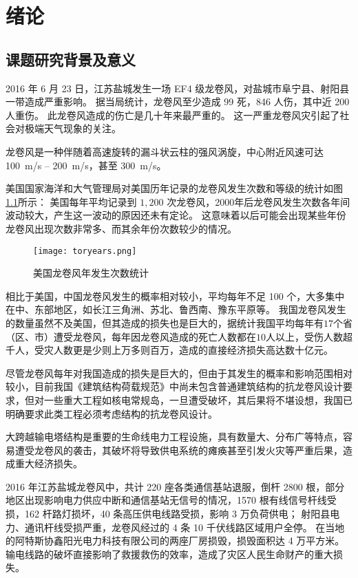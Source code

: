 \graphicspath{{figures/intro/}}

\chapter{绪论}

\section{课题研究背景及意义}
2016 年 6 月 23 日，江苏盐城发生一场 EF4 级龙卷风，对盐城市阜宁县、射阳县一带造成严重影响。
据当局统计，龙卷风至少造成 99 死，846 人伤，其中近 200 人重伤。
此龙卷风造成的伤亡是几十年来最严重的\cite{wiki2016yancheng}。
这一严重龙卷风灾引起了社会对极端天气现象的关注。

龙卷风是一种伴随着高速旋转的漏斗状云柱的强风涡旋，中心附近风速可达 \SI{100}{m/s} -- \SI{200}{m/s}，甚至 \SI{300}{m/s}。

美国国家海洋和大气管理局对美国历年记录的龙卷风发生次数和等级的统计如图\ref{fig:tornado-years}所示\cite{noaa2017tornado}：
美国每年平均记录到 $1,200$ 次龙卷风，2000年后龙卷风发生次数各年间波动较大，产生这一波动的原因还未有定论。
这意味着以后可能会出现某些年份龙卷风出现次数非常多、而其余年份次数较少的情况。

\begin{figure}[!htbp]
    \centering
    \texttt{[image: toryears.png]}
    \caption{美国龙卷风年发生次数统计}
    \label{fig:tornado-years}
\end{figure}

相比于美国，中国龙卷风发生的概率相对较小，平均每年不足 100 个，大多集中在中、东部地区，如长江三角洲、苏北、鲁西南、豫东平原等。
我国龙卷风发生的数量虽然不及美国，但其造成的损失也是巨大的，据统计我国平均每年有$17$个省（区、市）遭受龙卷风，每年因龙卷风造成的死亡人数都在$10$人以上，受伤人数超千人，受灾人数更是少则上万多则百万，造成的直接经济损失高达数十亿元\cite{liu2007chinese}。

尽管龙卷风每年对我国造成的损失是巨大的，但由于其发生的概率和影响范围相对较小，目前我国《建筑结构荷载规范》中尚未包含普通建筑结构的抗龙卷风设计要求，但对一些重大工程如核电常规岛，一旦遭受破坏，其后果将不堪设想，我国已明确要求此类工程必须考虑结构的抗龙卷风设计。

大跨越输电塔结构是重要的生命线电力工程设施，具有数量大、分布广等特点，容易遭受龙卷风的袭击，其破坏将导致供电系统的瘫痪甚至引发火灾等严重后果，造成重大经济损失。

2016 年江苏盐城龙卷风中，共计 220 座各类通信基站退服，倒杆 2800 根，部分地区出现影响电力供应中断和通信基站无信号的情况，1570 根有线信号杆线受损，162 杆路灯损坏，40 条高压供电线路受损，影响 3 万负荷供电；
射阳县电力、通讯杆线受损严重，龙卷风经过的 4 条 10 千伏线路区域用户全停。
在当地的阿特斯协鑫阳光电力科技有限公司的两座厂房损毁，损毁面积达 4 万平方米\cite{thepaper2016yancheng}。
输电线路的破坏直接影响了救援救伤的效率，造成了灾区人民生命财产的重大损失。

